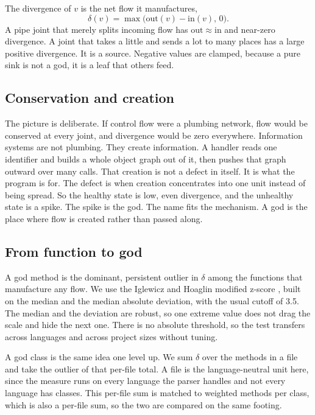 \documentclass[11pt,a4paper]{article}
\newcommand{\gain}{\ensuremath{\delta}}
\begin{document}
The divergence of $v$ is the net flow it manufactures,
\[
\gain(v) = \max\bigl(\mathrm{out}(v) - \mathrm{in}(v),\, 0\bigr).
\]
A pipe joint that merely splits incoming flow has $\mathrm{out} \approx
\mathrm{in}$ and near-zero divergence. A joint that takes a little and sends a lot
to many places has a large positive divergence. It is a source. Negative values are
clamped, because a pure sink is not a god, it is a leaf that others feed.

\subsection{Conservation and creation}
The picture is deliberate. If control flow were a plumbing network, flow would be
conserved at every joint, and divergence would be zero everywhere. Information
systems are not plumbing. They create information. A handler reads one identifier
and builds a whole object graph out of it, then pushes that graph outward over many
calls. That creation is not a defect in itself. It is what the program is for. The
defect is when creation concentrates into one unit instead of being spread. So the
healthy state is low, even divergence, and the unhealthy state is a spike. The
spike is the god. The name fits the mechanism. A god is the place where flow is
created rather than passed along.

\subsection{From function to god}
A god method is the dominant, persistent outlier in \gain{} among the functions that
manufacture any flow. We use the Iglewicz and Hoaglin modified z-score
\cite{iglewicz}, built on the median and the median absolute deviation, with the
usual cutoff of 3.5. The median and the deviation are robust, so one extreme value
does not drag the scale and hide the next one. There is no absolute threshold, so
the test transfers across languages and across project sizes without tuning.

A god class is the same idea one level up. We sum \gain{} over the methods in a file
and take the outlier of that per-file total. A file is the language-neutral unit
here, since the measure runs on every language the parser handles and not every
language has classes. This per-file sum is matched to weighted methods per class,
which is also a per-file sum, so the two are compared on the same footing.
\end{document}
